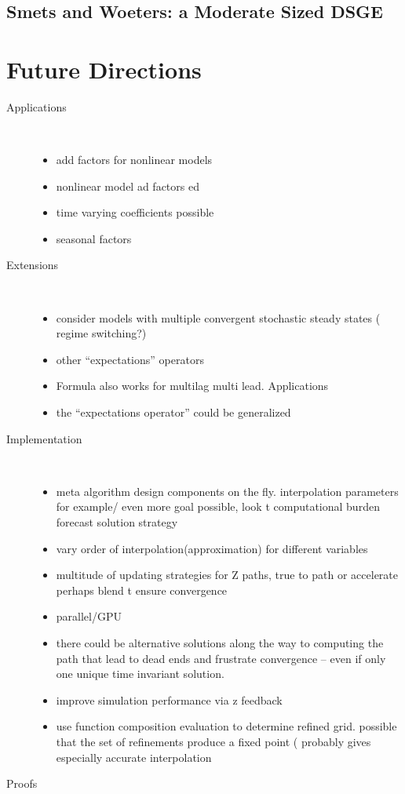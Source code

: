 \documentclass[12pt]{article}
\begin{document}
\subsection{Smets and Woeters: a Moderate Sized DSGE}


\section{Future Directions}
\label{sec:implementation}
\begin{description}
\item[Applications] \ 

  \begin{itemize}
\item add factors for nonlinear models
\item nonlinear model ad factors ed 
\item time varying coefficients possible
\item seasonal factors
  \end{itemize}
\item[Extensions] \ 

  \begin{itemize}
\item consider models with multiple convergent stochastic steady states ( regime switching?)
\item other ``expectations'' operators
\item Formula also works for multilag multi lead.  Applications
\item the ``expectations operator'' could be generalized
  \end{itemize}
\item[Implementation] \ 

  \begin{itemize}
\item meta algorithm design components  on the fly.  interpolation parameters for example/  even more goal possible, look t computational burden forecast solution strategy
\item vary order of interpolation(approximation) for different variables
\item multitude of updating strategies for Z paths, true to path or accelerate perhaps blend t ensure convergence
\item parallel/GPU
\item there could be alternative solutions along the way to computing the path that lead to dead ends and frustrate convergence -- even if only one unique time invariant solution.
\item improve simulation performance via z feedback
\item use function composition evaluation to determine refined grid. possible that the set of refinements produce a fixed point  ( probably gives especially accurate interpolation
  \end{itemize}
\item[Proofs] \ 


\end{description}
\end{document}
